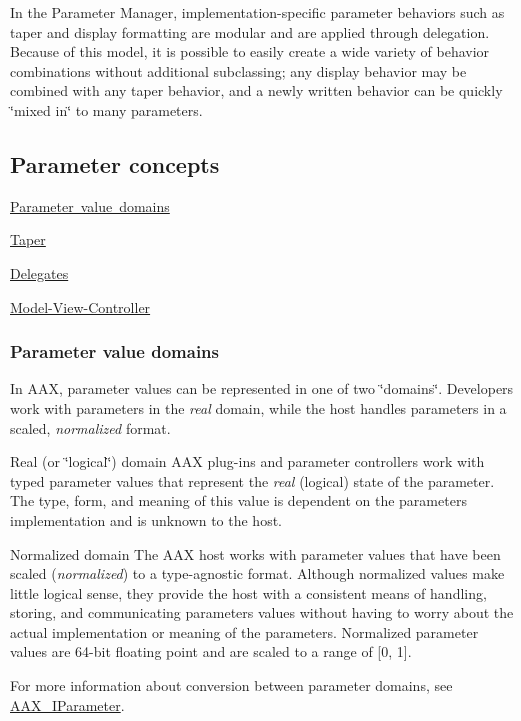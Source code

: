 In the Parameter Manager, implementation-\/specific parameter behaviors such as taper and display formatting are modular and are applied through delegation. Because of this model, it is possible to easily create a wide variety of behavior combinations without additional subclassing; any display behavior may be combined with any taper behavior, and a newly written behavior can be quickly \char`\"{}mixed in\char`\"{} to many parameters.\hypertarget{a00814_concepts}{}\subsection{Parameter concepts}\label{a00814_concepts}
\begin{DoxyItemize}
\item \mbox{\hyperlink{a00814_parameter_value_domains}{Parameter value domains}} \item \mbox{\hyperlink{a00814_taper}{Taper}} \item \mbox{\hyperlink{a00814_delegates}{Delegates}} \item \mbox{\hyperlink{a00814_model_view_controller}{Model-\/\+View-\/\+Controller}}\end{DoxyItemize}
\hypertarget{a00814_parameter_value_domains}{}\subsubsection{Parameter value domains}\label{a00814_parameter_value_domains}
In A\+AX, parameter values can be represented in one of two \char`\"{}domains\char`\"{}. Developers work with parameters in the {\itshape real} domain, while the host handles parameters in a scaled, {\itshape normalized} format.

\begin{DoxyParagraph}{Real (or \char`\"{}logical\char`\"{}) domain}
A\+AX plug-\/ins and parameter controllers work with typed parameter values that represent the {\itshape real} (logical) state of the parameter. The type, form, and meaning of this value is dependent on the parameter\textquotesingle{}s implementation and is unknown to the host.
\end{DoxyParagraph}
\begin{DoxyParagraph}{Normalized domain}
The A\+AX host works with parameter values that have been scaled ({\itshape normalized}) to a type-\/agnostic format. Although normalized values make little logical sense, they provide the host with a consistent means of handling, storing, and communicating parameters\textquotesingle{} values without having to worry about the actual implementation or meaning of the parameters. Normalized parameter values are 64-\/bit floating point and are scaled to a range of \mbox{[}0, 1\mbox{]}.
\end{DoxyParagraph}
For more information about conversion between parameter domains, see \mbox{\hyperlink{a01857}{A\+A\+X\+\_\+\+I\+Parameter}}.

